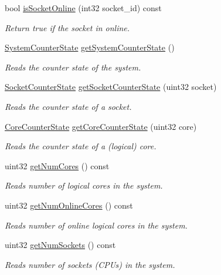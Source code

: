 \begin{DoxyCompactItemize}
bool \mbox{\hyperlink{class_p_c_m_a67f21fcae47cfb6153055bf922c8a981}{is\+Socket\+Online}} (int32 socket\+\_\+id) const
\begin{DoxyCompactList}\small\item\em Return true if the socket in online. \end{DoxyCompactList}\item 
\mbox{\hyperlink{class_system_counter_state}{System\+Counter\+State}} \mbox{\hyperlink{class_p_c_m_a603bf92fb67f294f5bc59185bc5c89cb}{get\+System\+Counter\+State}} ()
\begin{DoxyCompactList}\small\item\em Reads the counter state of the system. \end{DoxyCompactList}\item 
\mbox{\hyperlink{class_socket_counter_state}{Socket\+Counter\+State}} \mbox{\hyperlink{class_p_c_m_ade00dbbd2a71ec32ae6747bfca66cd3c}{get\+Socket\+Counter\+State}} (uint32 socket)
\begin{DoxyCompactList}\small\item\em Reads the counter state of a socket. \end{DoxyCompactList}\item 
\mbox{\hyperlink{class_core_counter_state}{Core\+Counter\+State}} \mbox{\hyperlink{class_p_c_m_a4ed1c64e3cb00c76851e3373a1fa54a3}{get\+Core\+Counter\+State}} (uint32 core)
\begin{DoxyCompactList}\small\item\em Reads the counter state of a (logical) core. \end{DoxyCompactList}\item 
uint32 \mbox{\hyperlink{class_p_c_m_a18d1666c08f014378cf49c707fc978d1}{get\+Num\+Cores}} () const
\begin{DoxyCompactList}\small\item\em Reads number of logical cores in the system. \end{DoxyCompactList}\item 
uint32 \mbox{\hyperlink{class_p_c_m_a30210eb2ddc9eee6bfe1db4b159f922b}{get\+Num\+Online\+Cores}} () const
\begin{DoxyCompactList}\small\item\em Reads number of online logical cores in the system. \end{DoxyCompactList}\item 
uint32 \mbox{\hyperlink{class_p_c_m_a7d4964e57e7692b5cc67d8b5056e5299}{get\+Num\+Sockets}} () const
\begin{DoxyCompactList}\small\item\em Reads number of sockets (C\+P\+Us) in the system. \end{DoxyCompactList}\item 

\end{DoxyCompactItemize}
